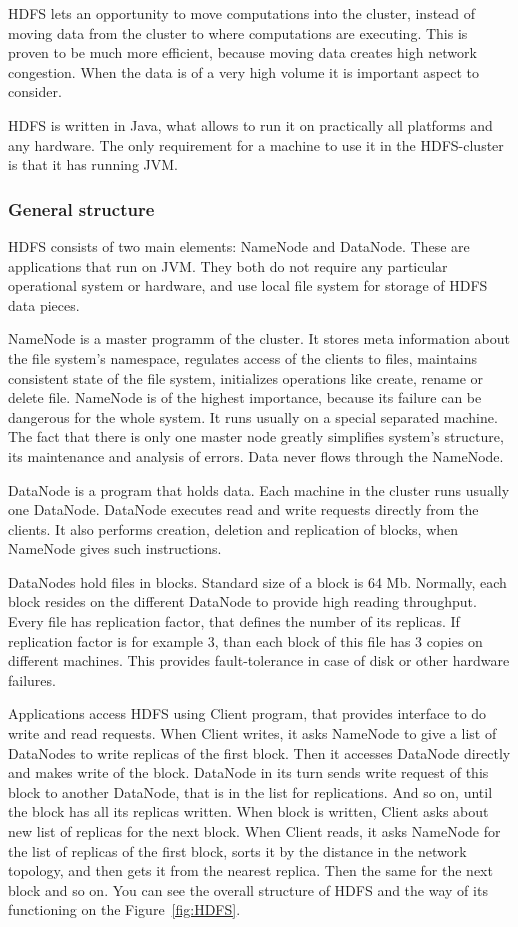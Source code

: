 HDFS lets an opportunity to move computations into the cluster, instead of moving data from the cluster to where computations are executing.
This is proven to be much more efficient, because moving data creates high network congestion.
When the data is of a very high volume it is important aspect to consider.

HDFS is written in Java, what allows to run it on practically all platforms and any hardware.
The only requirement for a machine to use it in the HDFS-cluster is that it has running JVM.

\subsubsection{General structure}

HDFS consists of two main elements: NameNode and DataNode.
These are applications that run on JVM.
They both do not require any particular operational system or hardware, and use local file system for storage of HDFS data pieces.

NameNode is a master programm of the cluster.
It stores meta information about the file system's namespace, regulates access of the clients to files, maintains consistent state of the file system, initializes operations like create, rename or delete file.
NameNode is of the highest importance, because its failure can be dangerous for the whole system.
It runs usually on a special separated machine.
The fact that there is only one master node greatly simplifies system's structure, its maintenance and analysis of errors.
Data never flows through the NameNode.

DataNode is a program that holds data.
Each machine in the cluster runs usually one DataNode.
DataNode executes read and write requests directly from the clients.
It also performs creation, deletion and replication of blocks, when NameNode gives such instructions.

DataNodes hold files in blocks.
Standard size of a block is 64 Mb.
Normally, each block resides on the different DataNode to provide high reading throughput.
Every file has replication factor, that defines the number of its replicas.
If replication factor is for example 3, than each block of this file has 3 copies on different machines.
This provides fault-tolerance in case of disk or other hardware failures.

Applications access HDFS using Client program, that provides interface to do write and read requests.
When Client writes, it asks NameNode to give a list of DataNodes to write replicas of the first block.
Then it accesses DataNode directly and makes write of the block.
DataNode in its turn sends write request of this block to another DataNode, that is in the list for replications.
And so on, until the block has all its replicas written.
When block is written, Client asks about new list of replicas for the next block.
When Client reads, it asks NameNode for the list of replicas of the first block, sorts it by the distance in the network topology, and then gets it from the nearest replica.
Then the same for the next block and so on.
You can see the overall structure of HDFS and the way of its functioning on the Figure~\ref{fig:HDFS}.

